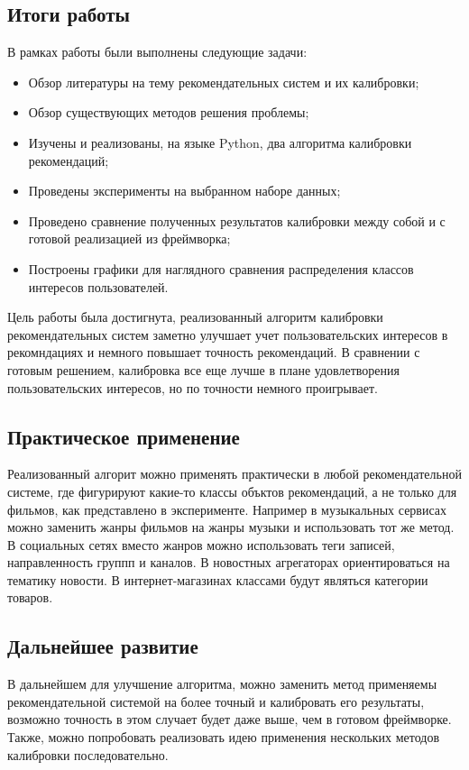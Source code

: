 \subsection*{Итоги работы}
В рамках работы были выполнены следующие задачи:
\begin{itemize}
    \item Обзор литературы на тему рекомендательных систем и их калибровки;
    \item Обзор существующих методов решения проблемы;
    \item Изучены и реализованы, на языке Python, два алгоритма калибровки рекомендаций;
    \item Проведены эксперименты на выбранном наборе данных;
    \item Проведено сравнение полученных результатов калибровки между собой и с готовой реализацией из фреймворка;
    \item Построены графики для наглядного сравнения распределения классов интересов пользователей.
\end{itemize}

Цель работы была достигнута, реализованный алгоритм калибровки рекомендательных систем
заметно улучшает учет пользовательских интересов в рекомндациях и немного повышает точность рекомендаций.
В сравнении с готовым решением, калибровка все еще лучше в плане удовлетворения пользовательских интересов, 
но по точности немного проигрывает.

\subsection*{Практическое применение}
Реализованный алгорит можно применять практически в любой рекомендательной системе, где фигурируют какие-то классы объктов рекомендаций, а не только для фильмов, как представлено в эксперименте.
Например в музыкальных сервисах можно заменить жанры фильмов на жанры музыки и использовать тот же метод.
В социальных сетях вместо жанров можно использовать теги записей, направленность группп и каналов. В новостных агрегаторах ориентироваться на тематику новости.
В интернет-магазинах классами будут являться категории товаров.

\subsection*{Дальнейшее развитие}
В дальнейшем для улучшение алгоритма, можно заменить метод применяемы рекомендательной системой на более точный и калибровать его результаты,
возможно точность в этом случает будет даже выше, чем в готовом фреймворке. Также, можно попробовать реализовать идею применения нескольких методов калибровки последовательно.
